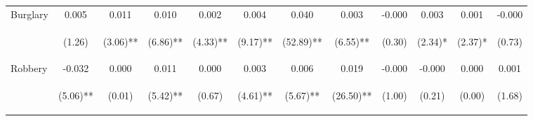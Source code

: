 \begin{tabular}{lccccccccccc}
\noalign{\smallskip}Burglary & 0.005 & 0.011 & 0.010 & 0.002 & 0.004 & 0.040 & 0.003 & -0.000 & 0.003 & 0.001 & -0.000\\
 & \begin{footnotesize}(1.26)\end{footnotesize} & \begin{footnotesize}(3.06)**\end{footnotesize} & \begin{footnotesize}(6.86)**\end{footnotesize} & \begin{footnotesize}(4.33)**\end{footnotesize} & \begin{footnotesize}(9.17)**\end{footnotesize} & \begin{footnotesize}(52.89)**\end{footnotesize} & \begin{footnotesize}(6.55)**\end{footnotesize} & \begin{footnotesize}(0.30)\end{footnotesize} & \begin{footnotesize}(2.34)*\end{footnotesize} & \begin{footnotesize}(2.37)*\end{footnotesize} & \begin{footnotesize}(0.73)\end{footnotesize}\\
\noalign{\smallskip}Robbery & -0.032 & 0.000 & 0.011 & 0.000 & 0.003 & 0.006 & 0.019 & -0.000 & -0.000 & 0.000 & 0.001\\
 & \begin{footnotesize}(5.06)**\end{footnotesize} & \begin{footnotesize}(0.01)\end{footnotesize} & \begin{footnotesize}(5.42)**\end{footnotesize} & \begin{footnotesize}(0.67)\end{footnotesize} & \begin{footnotesize}(4.61)**\end{footnotesize} & \begin{footnotesize}(5.67)**\end{footnotesize} & \begin{footnotesize}(26.50)**\end{footnotesize} & \begin{footnotesize}(1.00)\end{footnotesize} & \begin{footnotesize}(0.21)\end{footnotesize} & \begin{footnotesize}(0.00)\end{footnotesize} & \begin{footnotesize}(1.68)\end{footnotesize}\\

\end{tabular}
